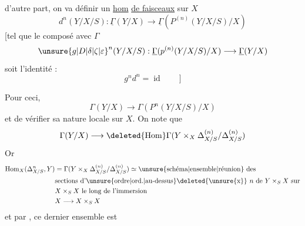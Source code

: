 d'autre part, on va définir un \uline{hom}  \uline{de faisceaux} sur $X$
\[
d^n(Y/X/S):\underline{\Gamma}(Y/X)\longrightarrow\underline{\Gamma}(P^{(n)}(Y/X/S)/X)
\]
[tel que le composé avec $\Gamma$
\[
{\unsure{g|D|\delta|\zeta|\varepsilon}}^n(Y/X/S):\underline{\Gamma}(p^{(n)}(Y/X/S)/X)\longrightarrow\underline{\Gamma}(Y/X)
\]
soit l'identité :
\[
g^n d^n=\operatorname{id}\qquad\big]
\]


Pour ceci,  
\[
\Gamma(Y/X)\longrightarrow\Gamma(P^n(Y/X/S)/X)
\]
et de vérifier sa nature locale sur $X$. On note que
\[
\Gamma(Y/X)\longrightarrow\deleted{\operatorname{Hom}}\Gamma(Y\times_X\Delta^{(n)}_{X/S}/\Delta^{(n)}_{X/S})
\]
Or
\[
\begin{aligned}
\operatorname{Hom}_X(\Delta^n_{X/S},Y)&=\Gamma(Y\times_X\Delta^{(n)}_{X/S}/\Delta^{(n)}_{X/S})\simeq\text{\unsure{schéma|ensemble|réunion} des}\\
&\text{sections d'\unsure{ordre|ord.|au-dessus}\deleted{\unsure{x}} $n$ de }Y\times_S X\text{ sur}\\
&X\times_S X\text{ le long de l'immersion}\\
&X\longrightarrow X\times_S X
\end{aligned}
\]
et par , ce dernier ensemble est

